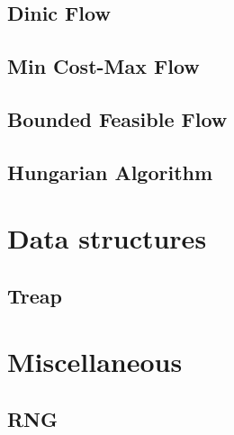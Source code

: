 \subsection{Dinic Flow}
\raggedbottom
\hrulefill
\subsection{Min Cost-Max Flow}
\raggedbottom
\hrulefill
\subsection{Bounded Feasible Flow}
\raggedbottom
\hrulefill
\subsection{Hungarian Algorithm}
\raggedbottom
\hrulefill

\section{Data structures}
\subsection{Treap}
\raggedbottom
\hrulefill

\section{Miscellaneous}
\subsection{RNG}
\raggedbottom
\hrulefill

